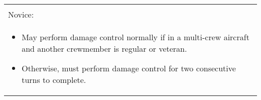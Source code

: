 \begin{onecolumntablefloat}
\begin{onecolumntable}
{\begin{tabularx}{\linewidth}{P}
\begin{itemize}[topsep=0pt]
\end{itemize}\\
Novice:\\
\begin{itemize}[topsep=0pt]
\item May perform damage control normally if in a multi-crew aircraft and another crewmember is regular or veteran.
\item Otherwise, must perform damage control for two consecutive turns to complete.
\end{itemize}\\
\bottomrule
\end{tabularx}
}
\end{onecolumntable}
\end{onecolumntablefloat}
